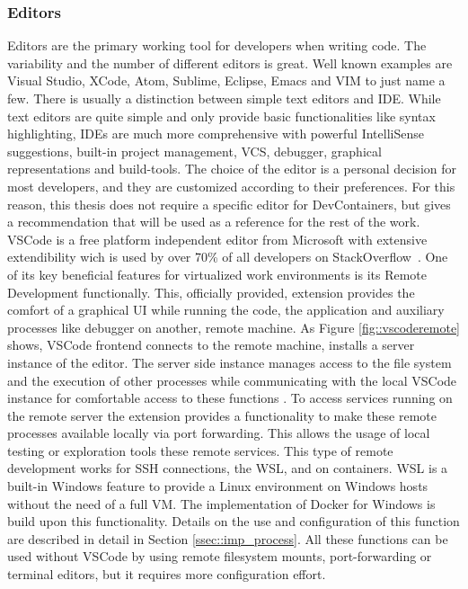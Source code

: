 \documentclass[12pt, a4paper]{article}
\begin{document}
        \subsubsection{Editors}
        Editors are the primary working tool for developers when writing code. The variability and the number of different editors is great. Well known examples are Visual Studio, XCode, Atom, Sublime, Eclipse, Emacs and VIM to just name a few. There is usually a distinction between simple text editors and \acl{IDE}. While text editors are quite simple and only provide basic functionalities like syntax highlighting, \ac{IDE}s are much more comprehensive with powerful IntelliSense suggestions, built-in project management, \ac{VCS}, debugger, graphical representations and build-tools. The choice of the editor is a personal decision for most developers, and they are customized according to their preferences. For this reason, this thesis does not require a specific editor for DevContainers, but gives a recommendation that will be used as a reference for the rest of the work.\newline
        \ac{VSCode} is a free platform independent editor from Microsoft with extensive extendibility wich is used by over 70\% of all developers on StackOverflow~\cite{stackoverflow2021}. One of its key beneficial features for virtualized work environments is its Remote Development functionally. This, officially provided, extension provides the comfort of a graphical \ac{UI} while running the code, the application and auxiliary processes like debugger on another, remote machine. As Figure \ref{fig::vscoderemote} shows, \ac{VSCode} frontend connects to the remote machine, installs a server instance of the editor. The server side instance manages access to the file system and the execution of other processes while communicating with the local \ac{VSCode} instance for comfortable access to these functions \cite{vscodedevcontainer}. To access services running on the remote server the extension provides a functionality to make these remote processes available locally via port forwarding. This allows the usage of local testing or exploration tools these remote services. This type of remote development works for \acs{SSH} connections, the \ac{WSL}, and on containers. \ac{WSL} is a built-in Windows feature to provide a Linux environment on Windows hosts without the need of a full \ac{VM}. The implementation of Docker for Windows is build upon this functionality. Details on the use and configuration of this function are described in detail in Section \ref{ssec::imp_process}. All these functions can be used without \ac{VSCode} by using remote filesystem mounts, port-forwarding or terminal editors, but it requires more configuration effort.
\end{document}
